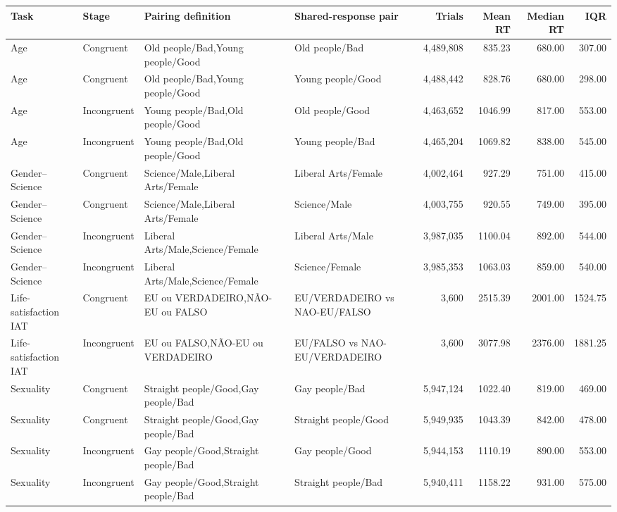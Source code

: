 \begin{tabular}{@{}llllrrrr@{}}
\toprule
Task & Stage & Pairing definition & Shared-response pair & Trials & Mean RT & Median RT & IQR \\
\midrule
Age & Congruent & Old people/Bad,Young people/Good & Old people/Bad & 4,489,808 & 835.23 & 680.00 & 307.00 \\
Age & Congruent & Old people/Bad,Young people/Good & Young people/Good & 4,488,442 & 828.76 & 680.00 & 298.00 \\
Age & Incongruent & Young people/Bad,Old people/Good & Old people/Good & 4,463,652 & 1046.99 & 817.00 & 553.00 \\
Age & Incongruent & Young people/Bad,Old people/Good & Young people/Bad & 4,465,204 & 1069.82 & 838.00 & 545.00 \\
Gender--Science & Congruent & Science/Male,Liberal Arts/Female & Liberal Arts/Female & 4,002,464 & 927.29 & 751.00 & 415.00 \\
Gender--Science & Congruent & Science/Male,Liberal Arts/Female & Science/Male & 4,003,755 & 920.55 & 749.00 & 395.00 \\
Gender--Science & Incongruent & Liberal Arts/Male,Science/Female & Liberal Arts/Male & 3,987,035 & 1100.04 & 892.00 & 544.00 \\
Gender--Science & Incongruent & Liberal Arts/Male,Science/Female & Science/Female & 3,985,353 & 1063.03 & 859.00 & 540.00 \\
Life-satisfaction IAT & Congruent & EU ou VERDADEIRO,NÃO-EU ou FALSO & EU/VERDADEIRO vs NAO-EU/FALSO & 3,600 & 2515.39 & 2001.00 & 1524.75 \\
Life-satisfaction IAT & Incongruent & EU ou FALSO,NÃO-EU ou VERDADEIRO & EU/FALSO vs NAO-EU/VERDADEIRO & 3,600 & 3077.98 & 2376.00 & 1881.25 \\
Sexuality & Congruent & Straight people/Good,Gay people/Bad & Gay people/Bad & 5,947,124 & 1022.40 & 819.00 & 469.00 \\
Sexuality & Congruent & Straight people/Good,Gay people/Bad & Straight people/Good & 5,949,935 & 1043.39 & 842.00 & 478.00 \\
Sexuality & Incongruent & Gay people/Good,Straight people/Bad & Gay people/Good & 5,944,153 & 1110.19 & 890.00 & 553.00 \\
Sexuality & Incongruent & Gay people/Good,Straight people/Bad & Straight people/Bad & 5,940,411 & 1158.22 & 931.00 & 575.00 \\
\bottomrule
\end{tabular}